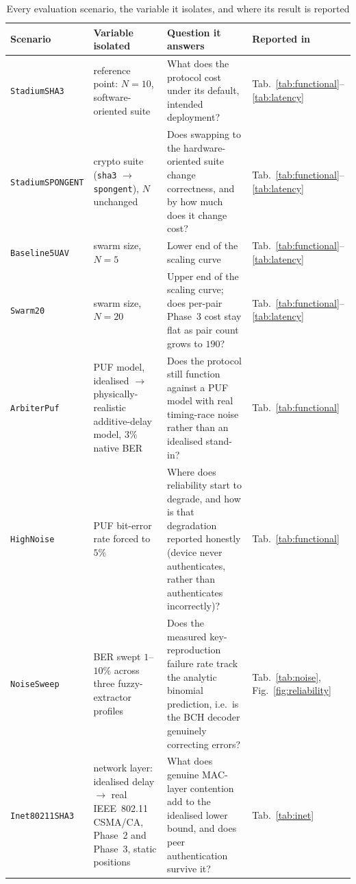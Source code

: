 \documentclass[11pt,a4paper]{article}
\begin{document}
\begin{table}[H]
\centering
\caption{Every evaluation scenario, the variable it isolates, and where its
result is reported}
\label{tab:scenarios}
\footnotesize
\begin{tabular}{@{}p{3.1cm}p{4.2cm}p{5.4cm}p{1.6cm}@{}}
\toprule
\textbf{Scenario} & \textbf{Variable isolated} & \textbf{Question it answers} & \textbf{Reported in} \\
\midrule
\texttt{StadiumSHA3} & reference point: $N{=}10$, software-oriented suite & What does the protocol cost under its default, intended deployment? & Tab.~\ref{tab:functional}--\ref{tab:latency} \\
\texttt{StadiumSPONGENT} & crypto suite (\texttt{sha3} $\rightarrow$ \texttt{spongent}), $N$ unchanged & Does swapping to the hardware-oriented suite change correctness, and by how much does it change cost? & Tab.~\ref{tab:functional}--\ref{tab:latency} \\
\texttt{Baseline5UAV} & swarm size, $N{=}5$ & Lower end of the scaling curve & Tab.~\ref{tab:functional}--\ref{tab:latency} \\
\texttt{Swarm20} & swarm size, $N{=}20$ & Upper end of the scaling curve; does per-pair Phase~3 cost stay flat as pair count grows to $190$? & Tab.~\ref{tab:functional}--\ref{tab:latency} \\
\texttt{ArbiterPuf} & PUF model, idealised $\rightarrow$ physically-realistic additive-delay model, $3\%$ native BER & Does the protocol still function against a PUF model with real timing-race noise rather than an idealised stand-in? & Tab.~\ref{tab:functional} \\
\texttt{HighNoise} & PUF bit-error rate forced to $5\%$ & Where does reliability start to degrade, and how is that degradation reported honestly (device never authenticates, rather than authenticates incorrectly)? & Tab.~\ref{tab:functional} \\
\texttt{NoiseSweep} & BER swept $1$--$10\%$ across three fuzzy-extractor profiles & Does the measured key-reproduction failure rate track the analytic binomial prediction, i.e.\ is the BCH decoder genuinely correcting errors? & Tab.~\ref{tab:noise}, Fig.~\ref{fig:reliability} \\
\texttt{Inet80211SHA3} & network layer: idealised delay $\rightarrow$ real IEEE~802.11 CSMA/CA, Phase~2 and Phase~3, static positions & What does genuine MAC-layer contention add to the idealised lower bound, and does peer authentication survive it? & Tab.~\ref{tab:inet} \\

\end{tabular}
\end{table}
\end{document}
